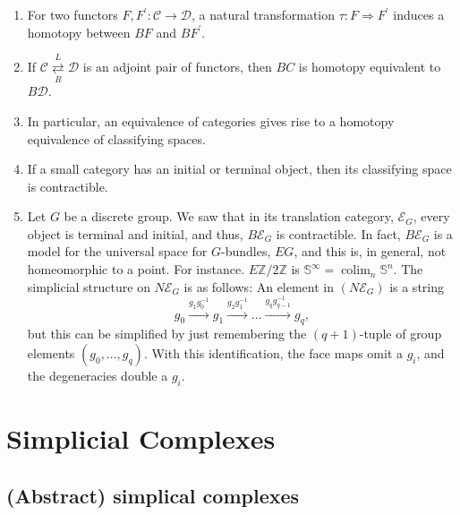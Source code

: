 \begin{theo}
    \begin{enumerate}
        \item For two functors $F, F^{\prime}: \mathcal{C} \rightarrow \mathcal{D}$, a natural transformation $\tau: F \Rightarrow F^{\prime}$ induces a homotopy between $B F$ and $B F^{\prime}$.
        \item If $\mathcal{C} \underset{R}{\stackrel{L}{\rightleftarrows}} \mathcal{D}$ is an adjoint pair of functors, then $B C$ is homotopy equivalent to $B \mathcal{D}$. 
        \item In particular, an equivalence of categories gives rise to a homotopy equivalence of classifying spaces.
        \item If a small category \cc has an initial or terminal object, then its classifying space is contractible.
        \item Let $G$ be a discrete group. We saw that in its translation category, $\mathcal{E}_G$, every object is terminal and initial, and thus, $B \mathcal{E}_G$ is contractible. In fact, $B \mathcal{E}_G$ is a model for the universal space for $G$-bundles, $E G$, and this is, in general, not homeomorphic to a point. For instance. $E \mathbb{Z} / 2 \mathbb{Z}$ is $\mathbb{S}^{\infty}=\operatorname{colim}_n \mathbb{S}^n$.
        The simplicial structure on $N \mathcal{E}_G$ is as follows: An element in $\left(N \mathcal{E}_G\right)$ is a string
        $$
        g_0 \xrightarrow{g_1 g_0^{-1}} g_1 \xrightarrow{g_2 g_1^{-1}} \ldots \xrightarrow{g_q g_{q-1}^{-1}} g_q,
        $$ but this can be simplified by just remembering the $(q+1)$-tuple of group elements $\left(g_0, \ldots, g_q\right)$. With this identification, the face maps omit a $g_i$, and the degeneracies double a $g_i$.
    \end{enumerate}
\end{theo}









\chapter{Simplicial Complexes}


\section{(Abstract) simplical complexes}

